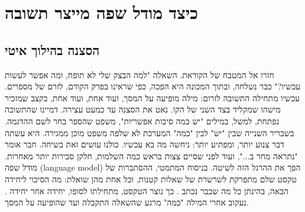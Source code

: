 \chapter{כיצד מודל שפה מייצר תשובה}\label{ch:04}
\section{הסצנה בהילוך איטי}
חזרו אל המטבח של הקוראת. השאלה "למה הבצק שלי לא תופח, ומה אפשר לעשות עכשיו?" כבר נשלחה, ובתוך המכונה היא הפכה, כפי שראינו בפרק הקודם, לזרם של מספרים. עכשיו מתחילה התשובה לזרום: מילה מופיעה על המסך, ועוד אחת, ועוד אחת, בקצב שמזכיר מישהו שמקליד בצד השני של הקו.
נאט את הסצנה עד כמעט עצירה. דמיינו שהתשובה נפתחת, למשל, במילים "יש כמה סיבות אפשריות", משפט שהספר בחר לשם ההדגמה. בשבריר השנייה שבין "יש" לבין "כמה" המערכת לא שלפה משפט מוכן ממגירה. היא עשתה דבר צנוע יותר, ומפתיע יותר: ניחשה מה בא עכשיו.
כולנו עושים זאת בשיחה. חבר אומר "נתראה מחר ב...", ועוד לפני שסיים צצות בראש כמה השלמות, חלקן סבירות יותר מאחרות. מודל שפה (language model) הפך את ההרגל הזה לשיטה. בניסוח המתמטי, ההסתברות של טקסט שלם מתפרקת לשרשרת של שאלות קטנות, וכל אחת מהן שואלת: מה הסיכוי ליחידה הבאה, בהינתן כל מה שכבר נכתב \cite{S-ch04-03,S-ch04-04}. כך נוצר הטקסט, מתחילתו לסופו, יחידה אחר יחידה \cite{S-ch04-03}. נעקוב אחרי המילה "כמה" מרגע שהשאלה התקבלה ועד שהופיעה על המסך.
